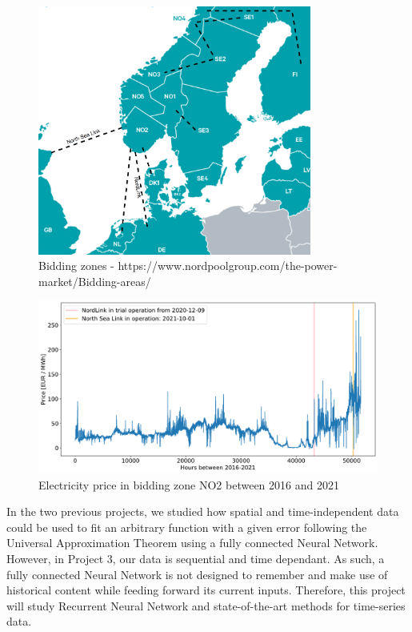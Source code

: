 \documentclass
[twocolumn,
secnumarabic,
nobibnotes,
aps,
prl,
reprint,
groupedaddress,
amsmath,
amssymb,
]{revtex4-2}
\begin{document}
\begin{figure}[t]
  \centering
  \includegraphics[width=90mm,scale=1.0]{figures/bidding_zones_selfmaid.png}
  \caption{\label{fig:biddin_zones}Bidding zones - https://www.nordpoolgroup.com/the-power-market/Bidding-areas/}

\end{figure}


\begin{figure}%
\includegraphics[width=2.0\columnwidth]{figures/price_2016_2021.pdf}
\caption{\label{fig:NO2_price} Electricity price in bidding zone NO2 between 2016 and 2021}
\end{figure}

In the two previous projects, we studied how spatial and time-independent data could be used to fit an arbitrary function with a given error following the Universal Approximation Theorem \cite{Nielsen2015} using a fully connected Neural Network. However, in Project 3, our data is sequential and time dependant. As such, a fully connected Neural Network is not designed to remember and make use of historical content while feeding forward its current inputs. Therefore, this project will study Recurrent Neural Network and state-of-the-art methods for time-series data.
\end{document}
